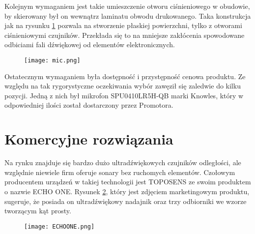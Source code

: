 \noindent
\vspace{2cm}

Kolejnym wymaganiem jest takie umieszczenie otworu ciśnieniowego w obudowie, by skierowany był on wewnątrz laminatu obwodu drukowanego. 
Taka konstrukcja jak na rysunku \ref{fig:mic} pozwala na stworzenie płaskiej powierzchni, tylko z otworami ciśnieniowymi czujników. 
Przekłada się to na mniejsze zakłócenia spowodowane odbiciami fali dźwiękowej od elementów elektronicznych.

\begin{figure}[ht!]
    \centering
    \texttt{[image: mic.png]}
    \label{fig:mic}
\end{figure}
\noindent
Ostatecznym wymaganiem była dostępność i przystępność cenowa produktu. Ze względu na tak rygorystyczne oczekiwania wybór zawęził się zaledwie do kilku pozycji.
Jedną z nich był mikrofon SPU0410LR5H-QB marki Knowles\cite{knowles}, który w odpowiedniej ilości został dostarczony przez Promotora.
\vspace{2cm}



\section{Komercyjne rozwiązania}
Na rynku znajduje się bardzo dużo ultradźwiękowych czujników odległości, ale względnie niewiele firm oferuje sonary bez ruchomych elementów.
Czołowym producentem urządzeń w takiej technologii jest TOPOSENS ze swoim produktem o nazwie ECHO ONE\textregistered.
Rysunek \ref{fig:echoone}, który jest zdjęciem marketingowym produktu, sugeruje, że posiada on ultradźwiękowy nadajnik oraz trzy odbiorniki we wzorze tworzącym kąt prosty.

\begin{figure}[ht!]
    \centering
    \texttt{[image: ECHOONE.png]}
    \label{fig:echoone}
\end{figure}

